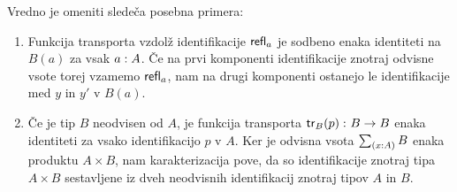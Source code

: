 Vredno je omeniti sledeča posebna primera:
\begin{enumerate}
\item Funkcija transporta vzdolž identifikacije \(\textnormal{\textsf{refl}}_{a}\) je sodbeno enaka identiteti na \(B(a)\) za vsak \(a : A\). Če na prvi komponenti identifikacije znotraj odvisne vsote torej vzamemo \(\textnormal{\textsf{refl}}_{a}\), nam na drugi komponenti ostanejo le identifikacije med \(y\) in \(y'\) v \(B(a)\).
\item Če je tip \(B\) neodvisen od \(A\), je funkcija transporta
  \(\textnormal{\textsf{tr}}_{B}(p) \,\colon B \to B\) enaka identiteti za vsako identifikacijo \(p\) v \(A\).
  Ker je odvisna vsota \(\textstyle \sum_{\left( x : A \right)} B\) enaka produktu \(A \times B\), nam karakterizacija pove, da so identifikacije znotraj tipa \(A \times B\) sestavljene iz dveh neodvisnih identifikacij znotraj tipov \(A\) in \(B\).
\end{enumerate}
